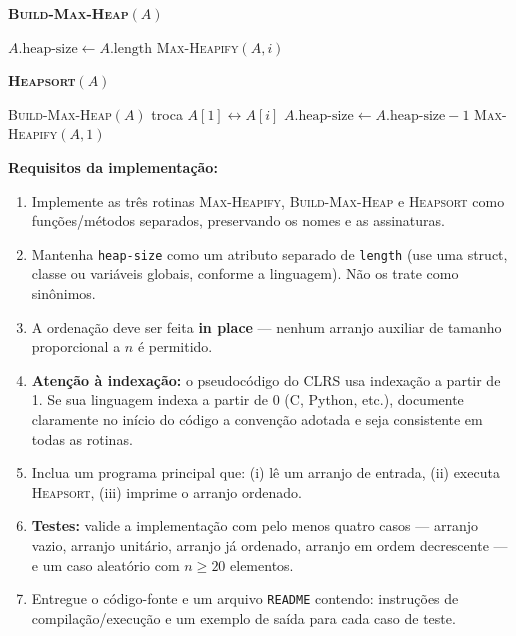 \documentclass[9pt,a4paper]{extarticle}
\begin{document}
\begin{enumerate}[resume]
    \begin{center}
    \begin{minipage}{0.7\textwidth}
    \textbf{\textsc{Build-Max-Heap}}$(A)$
    \begin{algorithmic}[1]
        \State $A.\text{heap-size} \gets A.\text{length}$
            \State \textsc{Max-Heapify}$(A, i)$
        \EndFor
    \end{algorithmic}
    \end{minipage}
    \end{center}

    \begin{center}
    \begin{minipage}{0.7\textwidth}
    \textbf{\textsc{Heapsort}}$(A)$
    \begin{algorithmic}[1]
        \State \textsc{Build-Max-Heap}$(A)$
            \State troca $A[1] \leftrightarrow A[i]$
            \State $A.\text{heap-size} \gets A.\text{heap-size} - 1$
            \State \textsc{Max-Heapify}$(A, 1)$
        \EndFor
    \end{algorithmic}
    \end{minipage}
    \end{center}

    \textbf{Requisitos da implementação:}
    \begin{enumerate}
        \item Implemente as três rotinas \textsc{Max-Heapify}, \textsc{Build-Max-Heap} e \textsc{Heapsort} como funções/métodos separados, preservando os nomes e as assinaturas.
        \item Mantenha \texttt{heap-size} como um atributo separado de \texttt{length} (use uma struct, classe ou variáveis globais, conforme a linguagem). Não os trate como sinônimos.
        \item A ordenação deve ser feita \textbf{in place} --- nenhum arranjo auxiliar de tamanho proporcional a $n$ é permitido.
        \item \textbf{Atenção à indexação:} o pseudocódigo do CLRS usa indexação a partir de 1. Se sua linguagem indexa a partir de 0 (C, Python, etc.), documente claramente no início do código a convenção adotada e seja consistente em todas as rotinas.
        \item Inclua um programa principal que: (i) lê um arranjo de entrada, (ii) executa \textsc{Heapsort}, (iii) imprime o arranjo ordenado.
        \item \textbf{Testes:} valide a implementação com pelo menos quatro casos --- arranjo vazio, arranjo unitário, arranjo já ordenado, arranjo em ordem decrescente --- e um caso aleatório com $n \geq 20$ elementos.
        \item Entregue o código-fonte e um arquivo \texttt{README} contendo: instruções de compilação/execução e um exemplo de saída para cada caso de teste.
    \end{enumerate}


\end{enumerate}
\end{document}
